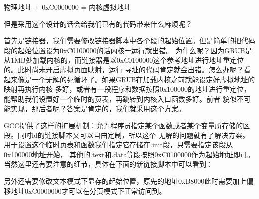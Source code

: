\par 物理地址 + 0xC0000000 = 内核虚拟地址

\par 但是采用这个设计的话会给我们已有的代码带来什么麻烦呢？

\par 首先是链接器，我们需要修改链接器脚本中各个段的起始位置。但是简单的把代码段的起始位置设为0xC0100000的话内核一运行就出错。\allowbreak
为什么呢？因为GRUB是从1MB处加载内核的，而链接器是以0xC0100000这个参考地址进行地址重定位的。此时尚未开启虚拟页面映射，运行\allowbreak
寻址的代码肯定就会出错。怎么办呢？看起来像是一个无解的死循环了。如果GRUB在加载内核之前就能设定好虚拟地址的映射再执行内核\allowbreak
多好，或者有一段程序和数据按照0x100000的地址进行重定位，能帮助我们设置好一个临时的页表，再跳转到内核入口函数多好。前者\allowbreak
貌似不可能实现，那后者呢？答案是肯定的，我们就采用这个方案。

\par GCC提供了这样的扩展机制：允许程序员指定某个函数或者某个变量所存储的区段。同时ld的链接脚本又可以自由定制，所以这个\allowbreak
无解的问题就有了解决方案。用于设置这个临时页表和函数我们指定它存储在.init段，只需要指定该段从0x100000地址开始，\allowbreak
其他的.text和.data等段按照0xC0100000作为起始地址即可。当然这里还有要注意的细节，具体在下面的新链接脚本中可以看到：


\par



\par 另外还需要修改文本模式下显存的起始位置，原先的地址0xB8000此时需要加上偏移地址0xC0000000才可以在分页模式下正常访问到。

